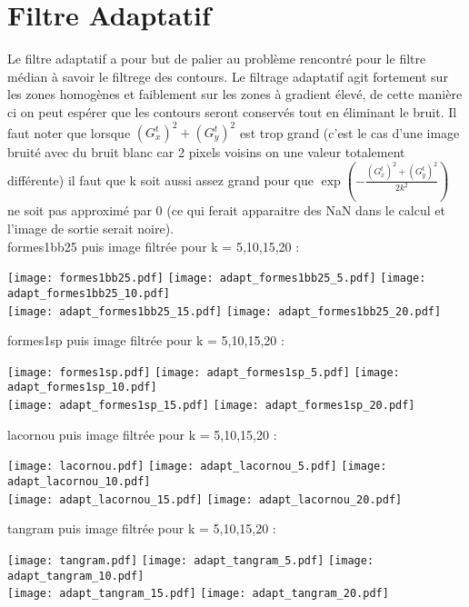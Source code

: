 \documentclass[12pt]{article}
\numberwithin{equation}{section}
\begin{document}
\section{Filtre Adaptatif}
Le filtre adaptatif a pour but de palier au problème rencontré pour le filtre médian à savoir le filtrege des contours. Le filtrage adaptatif agit fortement sur les zones homogènes et faiblement sur les zones à gradient élevé, de cette manière ci on peut espérer que les contours seront conservés tout en éliminant le bruit. Il faut noter que lorsque $(G_x^t)^2 + (G_y^t)^2$ est trop grand (c'est le cas d'une image bruité avec du bruit blanc car 2 pixels voisins on une valeur totalement différente) il faut que k soit aussi assez grand pour que $\exp(-\frac{(G_x^t)^2 + (G_y^t)^2}{2k^2})$ ne soit pas approximé par 0 (ce qui ferait apparaitre des NaN dans le calcul et l'image de sortie serait noire). \\
formes1bb25 puis image filtrée pour k = 5,10,15,20 :\\
\begin{center}
\texttt{[image: formes1bb25.pdf]}
\texttt{[image: adapt\_formes1bb25\_5.pdf]}
\texttt{[image: adapt\_formes1bb25\_10.pdf]}\\
\texttt{[image: adapt\_formes1bb25\_15.pdf]}
\texttt{[image: adapt\_formes1bb25\_20.pdf]}
\end{center}
formes1sp puis image filtrée pour k = 5,10,15,20 :\\
\begin{center}
\texttt{[image: formes1sp.pdf]}
\texttt{[image: adapt\_formes1sp\_5.pdf]}
\texttt{[image: adapt\_formes1sp\_10.pdf]}\\
\texttt{[image: adapt\_formes1sp\_15.pdf]}
\texttt{[image: adapt\_formes1sp\_20.pdf]}
\end{center}
lacornou puis image filtrée pour k = 5,10,15,20 :\\
\begin{center}
\texttt{[image: lacornou.pdf]}
\texttt{[image: adapt\_lacornou\_5.pdf]}
\texttt{[image: adapt\_lacornou\_10.pdf]}\\
\texttt{[image: adapt\_lacornou\_15.pdf]}
\texttt{[image: adapt\_lacornou\_20.pdf]}
\end{center}
tangram puis image filtrée pour k = 5,10,15,20 :\\
\begin{center}
\texttt{[image: tangram.pdf]}
\texttt{[image: adapt\_tangram\_5.pdf]}
\texttt{[image: adapt\_tangram\_10.pdf]}\\
\texttt{[image: adapt\_tangram\_15.pdf]}
\texttt{[image: adapt\_tangram\_20.pdf]}
\end{center}
\end{document}
